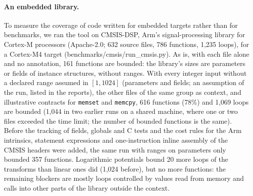 \documentclass[oneside,english]{amsart}
\numberwithin{equation}{section}
\numberwithin{figure}{section}
\theoremstyle{plain}
\theoremstyle{definition}
\theoremstyle{plain}
\theoremstyle{remark}
\theoremstyle{plain}
\theoremstyle{definition}
\theoremstyle{plain}
\theoremstyle{remark}
\newcommand{\lean}[1]{{\ttfamily\small #1}}
\begin{document}
\paragraph{An embedded library.}
To measure the coverage of code written for embedded targets rather than for benchmarks, we ran the tool on CMSIS-DSP, Arm's signal-processing library for Cortex-M processors (Apache-2.0; 632 source files, 786 functions, 1{,}235 loops), for a Cortex-M4 target (\lean{benchmarks/cmsis/run\_cmsis.py}). As is, with each file alone and no annotation, 161 functions are bounded: the library's sizes are parameters or fields of instance structures, without ranges. With every integer input without a declared range assumed in $[1, 1024]$ (parameters and fields; an assumption of the run, listed in the reports), the other files of the same group as context, and illustrative contracts for \texttt{memset} and \texttt{memcpy}, 616 functions (78\%) and 1{,}069 loops are bounded (1{,}044 in two earlier runs on a shared machine, where one or two files exceeded the time limit; the number of bounded functions is the same). Before the tracking of fields, globals and C tests and the cost rules for the Arm intrinsics, statement expressions and one-instruction inline assembly of the CMSIS headers were added, the same run with ranges on parameters only bounded 357 functions. Logarithmic potentials bound 20 more loops of the transforms than linear ones did (1{,}024 before), but no more functions: the remaining blockers are mostly loops controlled by values read from memory and calls into other parts of the library outside the context.
\end{document}
